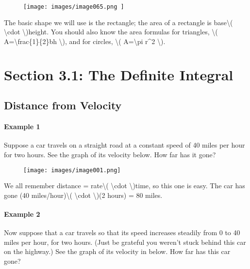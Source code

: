 \begin{figure}
\centering
\texttt{[image: images/image065.png
]}
\caption{}
\end{figure}

The basic shape we will use is the rectangle; the area of a rectangle is
base\textbackslash{}( \textbackslash{}cdot \textbackslash{})height. You
should also know the area formulas for triangles, \textbackslash{}(
A=\textbackslash{}frac\{1\}\{2\}bh \textbackslash{}), and for circles,
\textbackslash{}( A=\textbackslash{}pi r\^{}2 \textbackslash{}).

\hypertarget{section-3.1-the-definite-integral}{%
\section{Section 3.1: The Definite
Integral}\label{section-3.1-the-definite-integral}}

\hypertarget{distance-from-velocity}{%
\subsection{Distance from Velocity}\label{distance-from-velocity}}

\hypertarget{example-1}{%
\paragraph{Example 1}\label{example-1}}

Suppose a car travels on a straight road at a constant speed of 40 miles
per hour for two hours. See the graph of its velocity below. How far has
it gone?

\begin{figure}
\centering
\texttt{[image: images/image001.png]}
\caption{}
\end{figure}

We all remember distance = rate\textbackslash{}( \textbackslash{}cdot
\textbackslash{})time, so this one is easy. The car has gone (40
miles/hour)\textbackslash{}( \textbackslash{}cdot \textbackslash{})(2
hours) = 80 miles.

\hypertarget{example-2}{%
\paragraph{Example 2}\label{example-2}}

Now suppose that a car travels so that its speed increases steadily from
0 to 40 miles per hour, for two hours. (Just be grateful you weren't
stuck behind this car on the highway.) See the graph of its velocity in
below. How far has this car gone?

